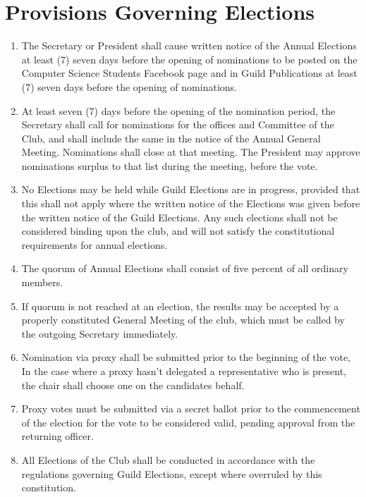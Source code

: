 \documentclass[10pt,a4paper]{report}
\begin{document}
	\section{Provisions Governing Elections}
		\begin{enumerate}[label=\alph*]
			\item The Secretary or President shall cause written notice of the Annual Elections at least (7) seven days before the opening of nominations to be posted on the Computer Science Students Facebook page and in Guild Publications at least (7) seven days before the opening of nominations.
			\item At least seven (7) days before the opening of the nomination period, the Secretary shall call for nominations for the offices and Committee of the Club, and shall include the same in the notice of the Annual General Meeting. Nominations shall close at that meeting. The President may approve nominations surplus to that list during the meeting, before the vote.
			\item No Elections may be held while Guild Elections are in progress, provided that this shall not apply where the written notice of the Elections was given before the written notice of the Guild Elections. Any such elections shall not be considered binding upon the club, and will not satisfy the constitutional requirements for annual elections.
			\item The quorum of Annual Elections shall consist of five percent of all ordinary members.
			\item If quorum is not reached at an election, the results may be accepted by a properly constituted General Meeting of the club, which must be called by the outgoing Secretary immediately.
			\item Nomination via proxy shall be submitted prior to the beginning of the vote, In the case where a proxy hasn't delegated a representative who is present, the chair shall choose one on the candidates behalf.
			\item Proxy votes must be submitted via a secret ballot prior to the commencement of the election for the vote to be considered valid, pending approval from the returning officer.
			\item All Elections of the Club shall be conducted in accordance with the regulations governing Guild Elections, except where overruled by this constitution.
		\end{enumerate}
\end{document}
